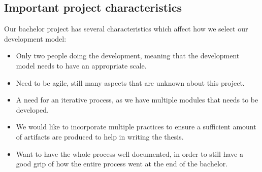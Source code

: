 \subsection{Important project characteristics}
Our bachelor project has several characteristics which affect how we select our development model:

\begin{itemize}

    \item Only two people doing the development, meaning that the development model needs to have an appropriate scale.
    \item Need to be agile, still many aspects that are unknown about this project.
    \item A need for an iterative process, as we have multiple modules that needs to be developed.
    \item We would like to incorporate multiple practices to ensure a sufficient amount of artifacts are produced to help in writing the thesis.
    \item Want to have the whole process well documented, in order to still have a good grip of how the entire process went at the end of the bachelor. 

\end{itemize}